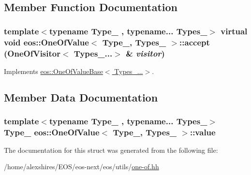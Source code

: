 \subsection{Member Function Documentation}
\hypertarget{structeos_1_1OneOfValue_a280c84a5d3ea4f659297217e7b95a3c2}{
\subsubsection[{accept}]{\setlength{\rightskip}{0pt plus 5cm}template$<$typename Type\_\- , typename... Types\_\-$>$ virtual void {\bf eos::OneOfValue}$<$ Type\_\-, Types\_\- $>$::accept ({\bf OneOfVisitor}$<$ Types\_\-...$>$ \& {\em visitor})}}
\label{structeos_1_1OneOfValue_a280c84a5d3ea4f659297217e7b95a3c2}


Implements \hyperlink{structeos_1_1OneOfValueBase_ad591bb797392ce70f45001d92d6c95bc}{eos::OneOfValueBase$<$ Types\_\-...$>$}.

\subsection{Member Data Documentation}
\hypertarget{structeos_1_1OneOfValue_a8c495ebdf36bdf308e6ecf85669517e5}{
\subsubsection[{value}]{\setlength{\rightskip}{0pt plus 5cm}template$<$typename Type\_\- , typename... Types\_\-$>$ Type\_\- {\bf eos::OneOfValue}$<$ Type\_\-, Types\_\- $>$::{\bf value}}}
\label{structeos_1_1OneOfValue_a8c495ebdf36bdf308e6ecf85669517e5}


The documentation for this struct was generated from the following file:\begin{DoxyCompactItemize}
\item 
/home/alexshires/EOS/eos-\/next/eos/utils/\hyperlink{one-of_8hh}{one-\/of.hh}\end{DoxyCompactItemize}
